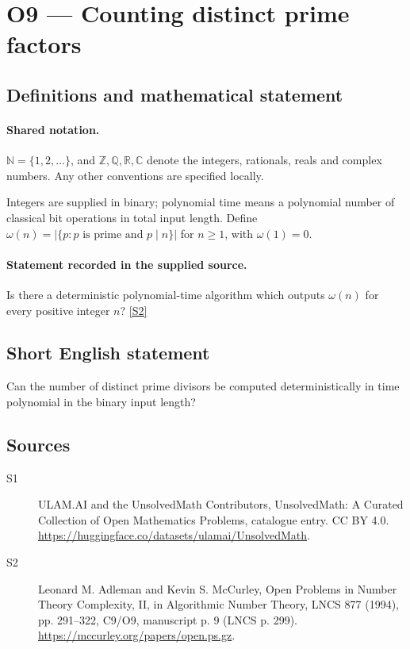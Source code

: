 \documentclass[11pt]{article}
\newcommand{\sref}[2]{\hyperlink{source:#1:#2}{[S#2]}}
\begin{document}
\section{O9 — Counting distinct prime factors}\label{statement}

\subsection{Definitions and mathematical statement}

\paragraph{Shared notation.}$\mathbb N=\{1,2,\ldots\}$, and $\mathbb Z,\mathbb Q,\mathbb R,\mathbb C$ denote the integers, rationals, reals and complex numbers. Any other conventions are specified locally.


Integers are supplied in binary; polynomial time means a polynomial number of classical bit operations in total input length. Define $\omega(n)=|\{p:p\text{ is prime and }p\mid n\}|$ for $n\ge1$, with $\omega(1)=0$.
\paragraph{Statement recorded in the supplied source.}
Is there a deterministic polynomial-time algorithm which outputs $\omega(n)$ for every positive integer $n$? \sref{statement}{2}
\subsection{Short English statement}
Can the number of distinct prime divisors be computed deterministically in time polynomial in the binary input length?
\subsection{Sources}
\begin{description}
\item[\hypertarget{source:statement:1}{S1}] ULAM.AI and the UnsolvedMath Contributors, UnsolvedMath: A Curated Collection of Open Mathematics Problems, catalogue entry. CC BY 4.0. \url{https://huggingface.co/datasets/ulamai/UnsolvedMath}.
\item[\hypertarget{source:statement:2}{S2}] Leonard M. Adleman and Kevin S. McCurley, Open Problems in Number Theory Complexity, II, in Algorithmic Number Theory, LNCS 877 (1994), pp. 291--322, C9/O9, manuscript p. 9 (LNCS p. 299). \url{https://mccurley.org/papers/open.ps.gz}.
\end{description}
\label{end:statement}
\end{document}
